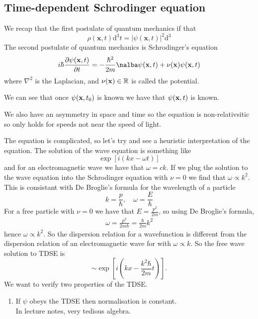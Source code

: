 \documentclass{article}
\begin{document}
\subsection{Time-dependent Schrodinger equation}
We recap that the first postulate of quantum mechanics if that 
\[
  \rho(\mathbf x,t)\mathrm d^3t=|\psi(\mathbf x,t)|^2\mathrm d^3
\]
The second postulate of quantum mechanics is Schrodinger's equation
\[
	i\hbar\frac{\partial\psi(\mathbf x,t)}{\partial t}=-\frac{\hbar^2}{2m}\nalba\psi(\mathbf x,t)+\nu(\mathbf x)\psi(\mathbf x,t)
\]
where $ \nabla^2 $ is the Laplacian, and $ \nu(\mathbf x)\in\mathbb{R} $ is called the potential.\par
We can see that once $ \psi(\mathbf{x},t_0) $ is known we have that $ \psi(\mathbf{x},t) $ is known.\par
We also have an asymmetry in space and time so the equation is non-relativsitic so only holds for speeds not near the speed of light.\par
The equation is complicated, so let's try and see a heuristic interpretation of the equation. The solution of the wave equation is something like
\[
	\exp[i(kx-\omega t)]
\]
and for an electromagnetic wave we have that $ \omega=ck $. If we plug the solution to the wave equation into the Schrodinger equation with $ \nu=0 $ we find that $ \omega\propto k^2 $. This is consistant with De Broglie's formula for the wavelength of a particle
\[
	k=\frac p\hbar,\quad \omega=\frac E\hbar
\]
For a free particle with $ \nu=0 $ we have that $ E=\frac{p^2}{2m} $, so using De Broglie's formula,
\begin{align*}
	\omega=\frac{p^2}{2m\hbar}=\frac{\hbar}{2m}k^2
\end{align*}
hence $ \omega\propto k^2 $. So the dispersion relation for a wavefunction is different from the dispersion relation of an electromagnetic wave for with $ \omega\propto k $. So the free wave solution to TDSE is
\[
	\sim \exp[i\left(kx-\frac{k^2\hbar}{2m}t\right)].
\]
We want to verify two properties of the TDSE.
\begin{enumerate}
	\item If $ \psi $ obeys the TDSE then normalisation is constant.\\
		\pf In lecture notes, very tedious algebra.
\end{enumerate}
\end{document}
